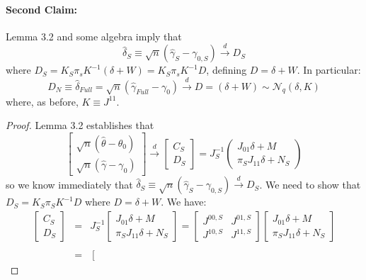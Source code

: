\documentclass[12pt]{article}
\theoremstyle{definition}
\begin{document}
\paragraph{Second Claim:} Lemma 3.2 and some algebra imply that
	$$\hat{\delta}_S \equiv \sqrt{n}(\hat{\gamma}_S - \gamma_{0,S})\overset{d}{\rightarrow} D_S$$
where $D_S = K_S \pi_s K^{-1}(\delta + W) = K_S \pi_s K^{-1}D$, defining $D = \delta + W$. In particular:
	$$
	D_N \equiv \hat{\delta}_{Full} = \sqrt{n}(\hat{\gamma}_{Full} -\gamma_0) \overset{d}{\rightarrow} D = (\delta+W) \sim \mathcal{N}_q(\delta,K)
$$
where, as before, $K \equiv J^{11}$.
\begin{proof}
Lemma 3.2 establishes that
	$$
	\left[\begin{array}{c}
		\sqrt{n} (\hat{\theta} - \theta_0)\\
		\sqrt{n} (\hat{\gamma} - \gamma_0)
\end{array}\right]\overset{d}{\rightarrow} 
	\left[\begin{array}{c}
		C_S\\
		D_S
	\end{array}\right] = J_S^{-1}
	\left(\begin{array}{c}
		J_{01}\delta + M\\
		\pi_S J_{11}\delta + N_S 
	\end{array}\right)$$
so we know immediately that $\hat{\delta}_S \equiv \sqrt{n} (\hat{\gamma}_S - \gamma_{0,S})\overset{d}{\rightarrow} D_S$. We need to show that $D_S = K_S\pi_S K^{-1}D$ where $D = \delta + W$. We have:
	\begin{eqnarray*}
		\left[\begin{array}{c}
		C_S\\
		D_S
	\end{array}\right] &=& J_S^{-1}
	\left[\begin{array}{c}
		J_{01}\delta + M\\
		\pi_S J_{11}\delta + N_S 
	\end{array}\right] = \left[\begin{array}{cc}
				J^{00,S}&J^{01,S}\\
				J^{10,S}&J^{11,S}	
		\end{array}\right] \left[\begin{array}{c}
		J_{01}\delta + M\\
		\pi_S J_{11}\delta + N_S 
	\end{array}\right] \\ \\
	&=& \left[\begin{array}{cc}

\end{array}
\end{eqnarray*}
\end{proof}
\end{document}
